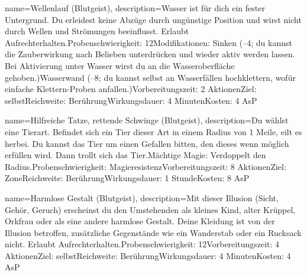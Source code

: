{
    name={Wellenlauf (Blutgeist)},
    description={Wasser ist für dich ein fester Untergrund. Du erleidest keine Abzüge durch ungünstige Position und wirst nicht durch Wellen und Strömungen beeinflusst. Erlaubt Aufrechterhalten.\newline Probenschwierigkeit: 12\newline Modifikationen: Sinken (–4; du kannst die Zauberwirkung nach Belieben unterdrücken und wieder aktiv werden lassen. Bei Aktivierung unter Wasser wirst du an die Wasseroberfläche gehoben.)\newline Wasserwand (–8; du kannst selbst an Wasserfällen hochklettern, wofür einfache Klettern-Proben anfallen.)\newline Vorbereitungszeit: 2 Aktionen\newline Ziel: selbst\newline Reichweite: Berührung\newline Wirkungsdauer: 4 Minuten\newline Kosten: 4 AsP}
}


{
    name={Hilfreiche Tatze, rettende Schwinge (Blutgeist)},
    description={Du wählst eine Tierart. Befindet sich ein Tier dieser Art in einem Radius von 1 Meile, eilt es herbei. Du kannst das Tier um einen Gefallen bitten, den dieses wenn möglich erfüllen wird. Dann trollt sich das Tier.\newline Mächtige Magie: Verdoppelt den Radius.\newline Probenschwierigkeit: Magieresistenz\newline Vorbereitungszeit: 8 Aktionen\newline Ziel: Zone\newline Reichweite: Berührung\newline Wirkungsdauer: 1 Stunde\newline Kosten: 8 AsP}
}


{
    name={Harmlose Gestalt (Blutgeist)},
    description={Mit dieser Illusion (Sicht, Gehör, Geruch) erscheinst du den Umstehenden als kleines Kind, alter Krüppel, Orkfrau oder als eine andere harmlose Gestalt. Deine Kleidung ist von der Illusion betroffen, zusätzliche Gegenstände wie ein Wanderstab oder ein Rucksack nicht. Erlaubt Aufrechterhalten.\newline Probenschwierigkeit: 12\newline Vorbereitungszeit: 4 Aktionen\newline Ziel: selbst\newline Reichweite: Berührung\newline Wirkungsdauer: 4 Minuten\newline Kosten: 4 AsP}
}


